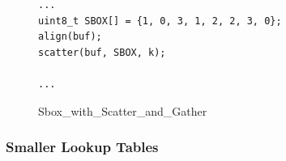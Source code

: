 \begin{figure}[h!]
    \centering
\begin{lstlisting}[xleftmargin=.02\textwidth,xrightmargin=.01\textwidth]
...
uint8_t SBOX[] = {1, 0, 3, 1, 2, 2, 3, 0};
align(buf);
scatter(buf, SBOX, k);

...
\end{lstlisting}
\caption{Sbox\_with\_Scatter\_and\_Gather}
\label{SBOX_sg}
\end{figure}

\subsubsection{Smaller Lookup Tables}
